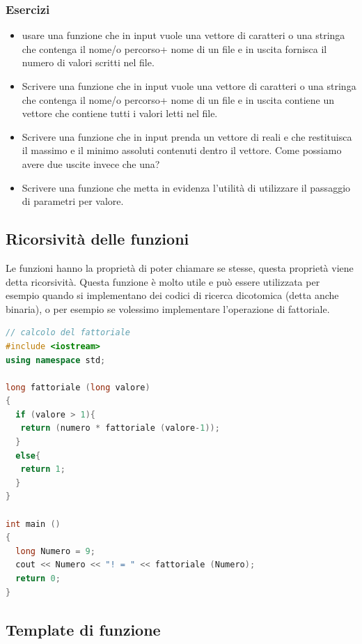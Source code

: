 \documentclass[11pt,fleqn]{book} %
\begin{document}
\subsubsection{Esercizi}

\begin{itemize}
\item usare una funzione che in input vuole una vettore di caratteri o una stringa che contenga il nome/o percorso+ nome di un file e in uscita fornisca il numero di valori scritti nel file.
\item Scrivere una funzione   che in input vuole una vettore di caratteri o una stringa che contenga il nome/o percorso+ nome di un file e in uscita contiene un vettore che contiene tutti i valori letti nel file.
\item Scrivere una funzione che in input prenda un vettore di reali e che restituisca il massimo e il minimo assoluti contenuti dentro il vettore. Come possiamo avere due uscite invece che una?
\item Scrivere una funzione che metta in evidenza l'utilità di utilizzare il passaggio di parametri per valore.
\end{itemize}


\subsection{Ricorsività delle funzioni}

Le funzioni hanno la proprietà di poter chiamare se stesse, questa proprietà viene detta ricorsività. Questa funzione è molto utile e può essere utilizzata per esempio quando si implementano dei codici di ricerca dicotomica (detta anche binaria), o per esempio se volessimo implementare l'operazione di fattoriale.





\begin{lstlisting}[language=c++]
// calcolo del fattoriale
#include <iostream>
using namespace std;

long fattoriale (long valore)
{
  if (valore > 1){
   return (numero * fattoriale (valore-1));
  }
  else{
   return 1;
  }
}

int main ()
{
  long Numero = 9;
  cout << Numero << "! = " << fattoriale (Numero);
  return 0;
}
\end{lstlisting}



\subsection{Template di funzione}
\end{document}
